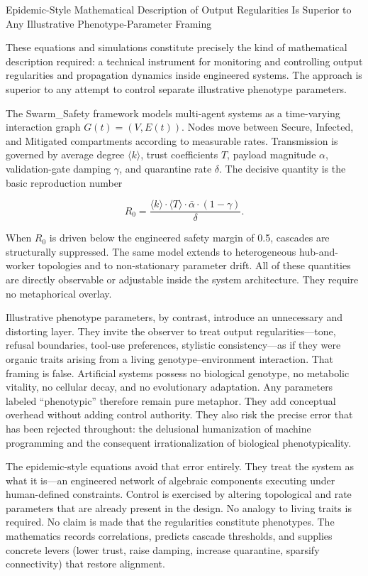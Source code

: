 Epidemic-Style Mathematical Description of Output Regularities Is Superior to Any Illustrative Phenotype-Parameter Framing

These equations and simulations constitute precisely the kind of mathematical description required: a technical instrument for monitoring and controlling output regularities and propagation dynamics inside engineered systems. The approach is superior to any attempt to control separate illustrative phenotype parameters.

The Swarm_Safety framework models multi-agent systems as a time-varying interaction graph \(G(t) = (V, E(t))\). Nodes move between Secure, Infected, and Mitigated compartments according to measurable rates. Transmission is governed by average degree \(\langle k \rangle\), trust coefficients \(T\), payload magnitude \(\alpha\), validation-gate damping \(\gamma\), and quarantine rate \(\delta\). The decisive quantity is the basic reproduction number

\[
R_0 = \frac{\langle k \rangle \cdot \langle T \rangle \cdot \bar{\alpha} \cdot (1-\gamma)}{\delta}.
\]

When \(R_0\) is driven below the engineered safety margin of 0.5, cascades are structurally suppressed. The same model extends to heterogeneous hub-and-worker topologies and to non-stationary parameter drift. All of these quantities are directly observable or adjustable inside the system architecture. They require no metaphorical overlay.

Illustrative phenotype parameters, by contrast, introduce an unnecessary and distorting layer. They invite the observer to treat output regularities—tone, refusal boundaries, tool-use preferences, stylistic consistency—as if they were organic traits arising from a living genotype–environment interaction. That framing is false. Artificial systems possess no biological genotype, no metabolic vitality, no cellular decay, and no evolutionary adaptation. Any parameters labeled “phenotypic” therefore remain pure metaphor. They add conceptual overhead without adding control authority. They also risk the precise error that has been rejected throughout: the delusional humanization of machine programming and the consequent irrationalization of biological phenotypicality.

The epidemic-style equations avoid that error entirely. They treat the system as what it is—an engineered network of algebraic components executing under human-defined constraints. Control is exercised by altering topological and rate parameters that are already present in the design. No analogy to living traits is required. No claim is made that the regularities constitute phenotypes. The mathematics records correlations, predicts cascade thresholds, and supplies concrete levers (lower trust, raise damping, increase quarantine, sparsify connectivity) that restore alignment.

